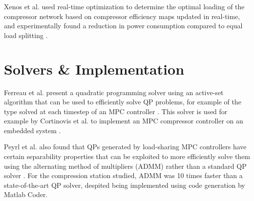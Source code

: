Xenos et al. used real-time optimization to determine the optimal loading of the compressor network based on compressor efficiency maps updated in real-time, and experimentally found a reduction in power consumption compared to equal load splitting \cite{Xenos2015}.






\section{Solvers \& Implementation}

Ferreau et al. present a quadratic programming solver using an active-set algorithm that can be used to efficiently solve QP problems, for example of the type solved at each timestep of an MPC controller \cite{Ferreau2014}. 
This solver is used for example by Cortinovis et al. to implement an MPC compressor controller on an embedded system \cite{Cortinovis2015}. 

Peyrl et al. also found that QPs generated by load-sharing MPC controllers have certain separability properties that can be exploited to more efficiently solve them using the alternating method of multipliers (ADMM) rather than a standard QP solver \cite{Peyrl2015}. For the compression station studied, ADMM was 10 times faster than a state-of-the-art QP solver, despited being implemented using code generation by Matlab Coder.




